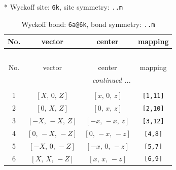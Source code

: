 \documentclass[fleqn,8pt]{jsarticle}
\begin{document}
* Wyckoff site: {\tt 6k}, site symmetry: {\tt ..m}
\renewcommand{\arraystretch}{1.2}
\begin{longtable}{cccc}
\caption{Wyckoff bond: {\tt 6a@6k}, bond symmetry: {\tt ..m}}
 \\
 \hline \hline
No. & vector & center & mapping \\ \hline \endfirsthead

\multicolumn{3}{l}{\tablename\ \thetable{}} \\
 \hline \hline
No. & vector & center & mapping \\ \hline \endhead

 \hline \hline
\multicolumn{3}{r}{\footnotesize\it continued ...} \\ \endfoot

 \hline \hline
\multicolumn{3}{r}{} \\ \endlastfoot

1 & $\left[ X,\, 0,\, Z \right]$ & $\left[ x,\, 0,\, z \right]$ & {\tt [1,11]} \\ \hline
2 & $\left[ 0,\, X,\, Z \right]$ & $\left[ 0,\, x,\, z \right]$ & {\tt [2,10]} \\ \hline
3 & $\left[ - X,\, - X,\, Z \right]$ & $\left[ - x,\, - x,\, z \right]$ & {\tt [3,12]} \\ \hline
4 & $\left[ 0,\, - X,\, - Z \right]$ & $\left[ 0,\, - x,\, - z \right]$ & {\tt [4,8]} \\ \hline
5 & $\left[ - X,\, 0,\, - Z \right]$ & $\left[ - x,\, 0,\, - z \right]$ & {\tt [5,7]} \\ \hline
6 & $\left[ X,\, X,\, - Z \right]$ & $\left[ x,\, x,\, - z \right]$ & {\tt [6,9]} \\
\end{longtable}
\renewcommand{\arraystretch}{1.2}
\end{document}
